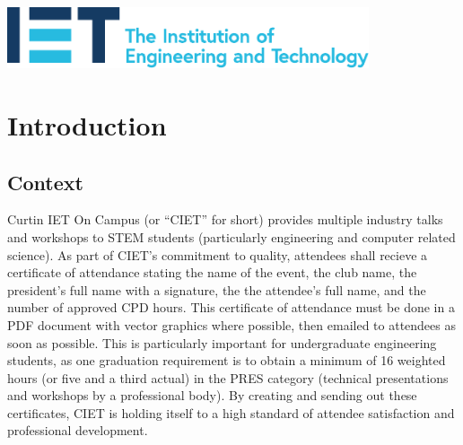 \documentclass[11pt]{article}
\begin{document}
\begin{titlepage}
    
    \vfill
    \includegraphics[width=0.8\textwidth]{../../assets/IET_Logo_Blue_RGB.pdf}\\
     
    
    \vfill %
    
\end{titlepage}


\tableofcontents

\bigskip

\listoffigures

\newpage


\setcounter{page}{1}

\section{Introduction}

\subsection{Context}

Curtin IET On Campus (or ``CIET'' for short) provides multiple industry talks and workshops to STEM students (particularly engineering and computer related science). As part of CIET's commitment to quality, attendees shall recieve a certificate of attendance stating the name of the event, the club name, the president's full name with a signature, the the attendee's full name, and the number of approved CPD hours. This certificate of attendance must be done in a PDF document with vector graphics where possible, then emailed to attendees as soon as possible. This is particularly important for undergraduate engineering students, as one graduation requirement is to obtain a minimum of 16 weighted hours (or five and a third actual) in the PRES category (technical presentations and workshops by a professional body). By creating and sending out these certificates, CIET is holding itself to a high standard of attendee satisfaction and professional development.
\end{document}
